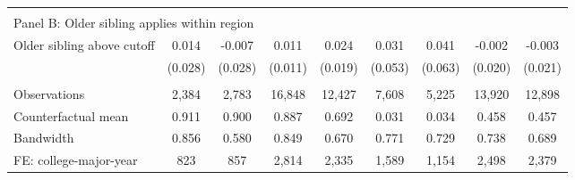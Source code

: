 {{\begin{tabular}{lcccccccc}
&  &  &  & & & & & &    \\
\multicolumn{9}{l}{Panel B: Older sibling applies within region} \\
Older sibling above cutoff&       0.014   &      -0.007   &       0.011   &       0.024   &       0.031   &       0.041   &      -0.002   &      -0.003   \\
                    &     (0.028)   &     (0.028)   &     (0.011)   &     (0.019)   &     (0.053)   &     (0.063)   &     (0.020)   &     (0.021)   \\
                    &               &               &               &               &               &               &               &               \\
Observations        &       2,384   &       2,783   &      16,848   &      12,427   &       7,608   &       5,225   &      13,920   &      12,898   \\
Counterfactual mean &       0.911   &       0.900   &       0.887   &       0.692   &       0.031   &       0.034   &       0.458   &       0.457   \\
Bandwidth           &       0.856   &       0.580   &       0.849   &       0.670   &       0.771   &       0.729   &       0.738   &       0.689   \\
FE: college-major-year&         823   &         857   &       2,814   &       2,335   &       1,589   &       1,154   &       2,498   &       2,379   \\
 

\bottomrule
\end{tabular}
}
}
